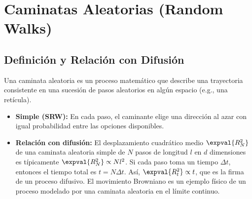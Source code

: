 \documentclass[11pt,a4paper]{article}
\begin{document}
\section{Caminatas Aleatorias (Random Walks)}
\subsection{Definición y Relación con Difusión}
Una caminata aleatoria es un proceso matemático que describe una trayectoria consistente en una sucesión de pasos aleatorios en algún espacio (e.g., una retícula).
\begin{itemize}
    \item \textbf{Simple (SRW):} En cada paso, el caminante elige una dirección al azar con igual probabilidad entre las opciones disponibles.
    \item \textbf{Relación con difusión:} El desplazamiento cuadrático medio $\expval{R_N^2}$ de una caminata aleatoria simple de $N$ pasos de longitud $l$ en $d$ dimensiones es típicamente $\expval{R_N^2} \propto Nl^2$. Si cada paso toma un tiempo $\Delta t$, entonces el tiempo total es $t = N\Delta t$. Así, $\expval{R_t^2} \propto t$, que es la firma de un proceso difusivo. El movimiento Browniano es un ejemplo físico de un proceso modelado por una caminata aleatoria en el límite continuo.
\end{itemize}
\end{document}
